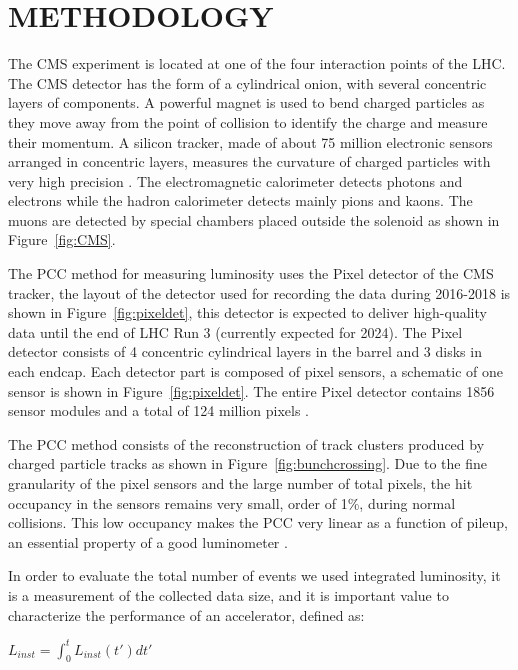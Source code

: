 \documentclass[final,12p]{article}
\begin{document}
\section{METHODOLOGY}


The CMS experiment is located at one of the four interaction points of the LHC.
The CMS detector has the form of a cylindrical onion, with several concentric layers of components.
A powerful magnet is used to bend charged particles as they move away from the point of collision to identify the charge and measure their momentum.
A silicon tracker, made of about 75 million electronic sensors arranged in concentric layers, measures the curvature of charged particles with very high precision \cite{Chatrchyan:2008aa}.
The electromagnetic calorimeter detects photons and electrons while the hadron calorimeter detects mainly pions and kaons.
The muons are detected by special chambers placed outside the solenoid as shown in Figure~\ref{fig:CMS}.

The PCC method for measuring luminosity uses the Pixel detector of the CMS tracker, the layout of the  detector used for recording the data during 2016-2018 is shown in Figure~\ref{fig:pixeldet},  this detector is expected to deliver high-quality data until the end of LHC Run 3 (currently expected for 2024).
The Pixel detector consists of 4 concentric cylindrical layers in the barrel and 3 disks in each endcap.
Each detector part is composed of pixel sensors, a schematic of one sensor is shown in Figure~\ref{fig:pixeldet}.
The entire Pixel detector contains 1856 sensor modules and a total of 124 million pixels \cite{TrackerGroupoftheCMS:2020bgg}.

The PCC method consists of the reconstruction of track clusters produced by charged particle tracks as shown in Figure~\ref{fig:bunchcrossing}.
Due to the fine granularity of the pixel sensors and the large number of total pixels, the hit occupancy in the sensors remains very small, order of 1\%, during normal collisions.
This low occupancy makes the PCC  very linear as a function of pileup, an essential property of a good luminometer \cite{Sirunyan:2021qkt}.

In order to evaluate the total number of events we used integrated luminosity, it is a measurement of the collected data size, and it is important value to characterize the performance of an accelerator, defined as: \\ 


\begin{center}
$L_{inst} = \int _{0}^{t} L_{inst}(t') dt'$ \\ 
\end{center}
\end{document}
